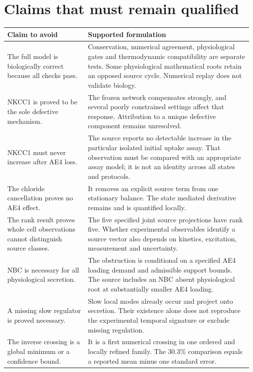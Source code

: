 \section{Claims that must remain qualified}
\label{sec:report-qualified-claims}
\begin{longtable}{>{\raggedright\arraybackslash}p{.30\linewidth}>{\raggedright\arraybackslash}p{.63\linewidth}}
\toprule
Claim to avoid & Supported formulation\\\midrule\endhead
The full model is biologically correct because all checks pass. & Conservation, numerical agreement, physiological gates and thermodynamic compatibility are separate tests. Some physiological mathematical roots retain an opposed source cycle. Numerical replay does not validate biology.\\
NKCC1 is proved to be the sole defective mechanism. & The frozen network compensates strongly, and several poorly constrained settings affect that response. Attribution to a unique defective component remains unresolved.\\
NKCC1 must never increase after AE4 loss. & The source reports no detectable increase in the particular isolated initial uptake assay. That observation must be compared with an appropriate assay model; it is not an identity across all states and protocols.\\
The chloride cancellation proves no AE4 effect. & It removes an explicit source term from one stationary balance. The state mediated derivative remains and is quantified locally.\\
The rank result proves whole cell observations cannot distinguish source classes. & The five specified joint source projections have rank five. Whether experimental observables identify a source vector also depends on kinetics, excitation, measurement and uncertainty.\\
NBC is necessary for all physiological secretion. & The obstruction is conditional on a specified AE4 loading demand and admissible support bounds. The source includes an NBC absent physiological root at substantially smaller AE4 loading.\\
A missing slow regulator is proved necessary. & Slow local modes already occur and project onto secretion. Their existence alone does not reproduce the experimental temporal signature or exclude missing regulation.\\
The inverse crossing is a global minimum or a confidence bound. & It is a first numerical crossing in one ordered and locally refined family. The 30.3\% comparison equals a reported mean minus one standard error.\\

\end{longtable}
